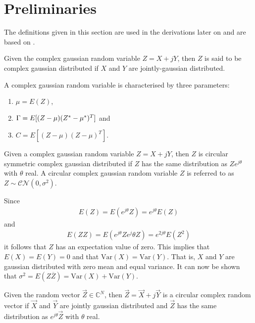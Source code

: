 \documentclass[a4paper, openany, oneside]{memoir}
\begin{document}
\section{Preliminaries}
The definitions given in this section are used in the derivations later on and are based  on \cite{yates2005probability}.

\begin{blockDefinition}
Given the complex gaussian random variable $Z = X + jY$, then $Z$ is said to be complex gaussian distributed if $X$ and $Y$ are jointly-gaussian distributed.
\end{blockDefinition}

 A complex gaussian random variable is characterised by three parameters:
\begin{enumerate}
    \item $\mu = E(Z)$,
    \item $\Gamma = E[(Z-\mu)(Z^*-\mu^*)^T]$ and
    \item $C = E[(Z-\mu)(Z-\mu)^T]$.
\end{enumerate}

\begin{blockDefinition}
Given a complex gaussian random variable $Z = X + jY$, then $Z$ is circular symmetric complex gaussian distributed if $Z$ has the same distribution as $Ze^{j\theta}$ with $\theta$ real. A circular complex gaussian random variable $Z$ is referred to as $Z \sim \mathcal{CN}(0,\sigma^2)$.
\end{blockDefinition}

Since
\begin{align*}
    E(Z) = E(e^{j\theta}Z)  = e^{j\theta}E(Z) 
\end{align*}
and
\begin{align*}
    E(ZZ) = E(e^{j\theta}Z e^j\theta{Z})  = e^{2j\theta}E(Z^2) 
\end{align*}
it follows that $Z$ has an expectation value of zero.%
This implies that $E(X) = E(Y) = 0$ and that $\text{Var}\left(X\right) = \text{Var}\left(Y\right)$. That is, $X$ and $Y$ are gaussian distributed
with zero mean and equal variance.  It can now be shown that $\sigma^2= E(Z\overline{Z}) = \text{Var}\left(X\right) + \text{Var}\left(Y\right)$. 

\begin{blockDefinition}
Given the random vector $\vec{Z} \in \mathbb{C}^N$, then $\vec{Z} = \vec{X} + j\vec{Y}$ is a circular complex random vector if $\vec{X}$ and $\vec{Y}$ are jointly gaussian distributed and $\vec{Z}$ has the same distribution as $e^{j\theta}\vec{Z}$ with $\theta$ real.
\end{blockDefinition}
\end{document}
